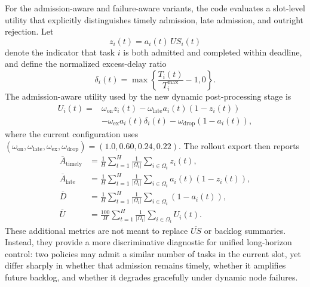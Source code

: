 For the admission-aware and failure-aware variants, the code evaluates a slot-level utility that explicitly distinguishes timely admission, late admission, and outright rejection. Let
\begin{equation}
    z_i(t) = a_i(t)\,US_i(t)
\end{equation}
denote the indicator that task $i$ is both admitted and completed within deadline, and define the normalized excess-delay ratio
\begin{equation}
    \delta_i(t) = \max\left\{\frac{T_i(t)}{T_i^{\max}} - 1, 0\right\}.
\end{equation}
The admission-aware utility used by the new dynamic post-processing stage is
\begin{equation}
\begin{aligned}
    U_i(t) ={}& \omega_{\mathrm{on}} z_i(t) - \omega_{\mathrm{late}} a_i(t)\left(1-z_i(t)\right) \\
    &- \omega_{\mathrm{ex}} a_i(t)\delta_i(t) - \omega_{\mathrm{drop}}\left(1-a_i(t)\right),
\end{aligned}
\end{equation}
where the current configuration uses $(\omega_{\mathrm{on}}, \omega_{\mathrm{late}}, \omega_{\mathrm{ex}}, \omega_{\mathrm{drop}}) = (1.0, 0.60, 0.24, 0.22)$. The rollout export then reports
\begin{align}
    \overline{A}_{\mathrm{timely}} &= \frac{1}{H}\sum_{t=1}^{H}\frac{1}{|\Omega_t|}\sum_{i \in \Omega_t} z_i(t),\\
    \overline{A}_{\mathrm{late}} &= \frac{1}{H}\sum_{t=1}^{H}\frac{1}{|\Omega_t|}\sum_{i \in \Omega_t} a_i(t)\left(1-z_i(t)\right),\\
    \overline{D} &= \frac{1}{H}\sum_{t=1}^{H}\frac{1}{|\Omega_t|}\sum_{i \in \Omega_t} \left(1-a_i(t)\right),\\
    \overline{U} &= \frac{100}{H}\sum_{t=1}^{H}\frac{1}{|\Omega_t|}\sum_{i \in \Omega_t} U_i(t).
\end{align}
These additional metrics are not meant to replace $\overline{US}$ or backlog summaries. Instead, they provide a more discriminative diagnostic for unified long-horizon control: two policies may admit a similar number of tasks in the current slot, yet differ sharply in whether that admission remains timely, whether it amplifies future backlog, and whether it degrades gracefully under dynamic node failures.
